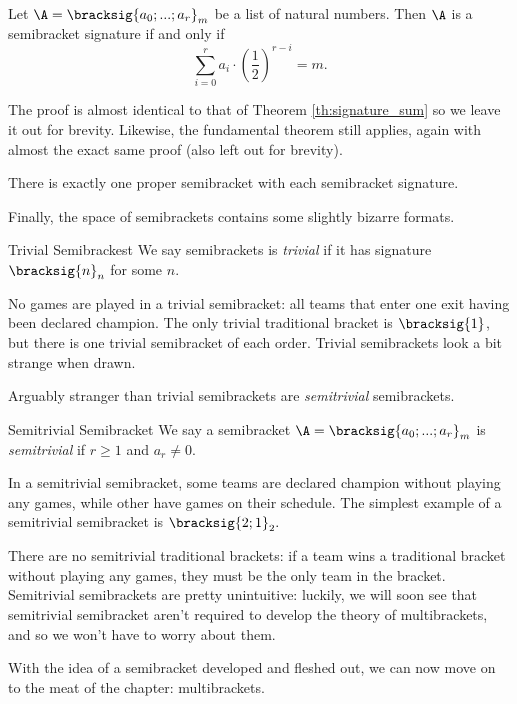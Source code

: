 {    \begin{theorem}{}{}
        Let $\A = \bracksig{a_0; ...; a_r}_m$ be a list of natural numbers. Then $\A$ is a semibracket signature if and only if $$\sum_{i=0}^r a_i \cdot \left(\frac{1}{2}\right)^{r - i} = m.$$
    \end{theorem}

    The proof is almost identical to that of Theorem \ref{th:signature_sum} so we leave it out for brevity. Likewise, the fundamental theorem still applies, again with almost the exact same proof (also left out for brevity).

    \begin{theorem}{}{}
        There is exactly one proper semibracket with each semibracket signature.
    \end{theorem}

    Finally, the space of semibrackets contains some slightly bizarre formats.

    \begin{definition}{Trivial Semibrackest}{}
        We say semibrackets is \textit{trivial} if it has signature $\bracksig{n}_n$ for some $n$.
    \end{definition}

    No games are played in a trivial semibracket: all teams that enter one exit having been declared champion. The only trivial traditional bracket is $\bracksig{1}$, but there is one trivial semibracket of each order. Trivial semibrackets look a bit strange when drawn.


    Arguably stranger than trivial semibrackets are \textit{semitrivial} semibrackets.

    \begin{definition}{Semitrivial Semibracket}{}
        We say a semibracket $\A = \bracksig{a_0; ...; a_r}_m$ is \textit{semitrivial} if $r \geq 1$ and $a_r \neq 0.$
    \end{definition}

    In a semitrivial semibracket, some teams are declared champion without playing any games, while other have games on their schedule. The simplest example of a semitrivial semibracket is $\bracksig{2;1}_2.$


    There are no semitrivial traditional brackets: if a team wins a traditional bracket without playing any games, they must be the only team in the bracket. Semitrivial semibrackets are pretty unintuitive: luckily, we will soon see that semitrivial semibracket aren't required to develop the theory of multibrackets, and so we won't have to worry about them.

    With the idea of a semibracket developed and fleshed out, we can now move on to the meat of the chapter: multibrackets.
}
